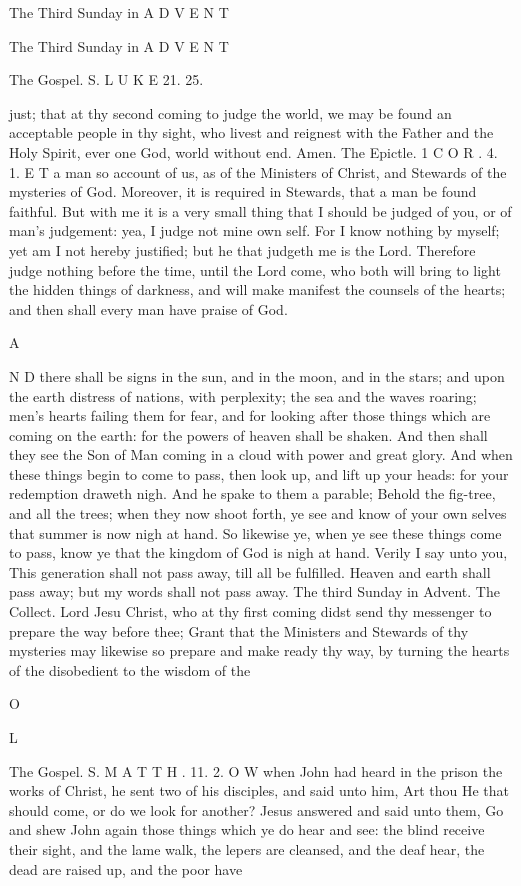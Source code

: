 The Third Sunday in A D V E N T

The Third Sunday in A D V E N T

The Gospel. S. L U K E 21. 25.

just; that at thy second coming to judge the world, we may be found an acceptable people in thy sight, who livest and reignest with the Father and the Holy Spirit, ever one God, world without end. Amen. The Epictle. 1 C O R . 4. 1. E T a man so account of us, as of the Ministers of Christ, and Stewards of the mysteries of God. Moreover, it is required in Stewards, that a man be found faithful. But with me it is a very small thing that I should be judged of you, or of man's judgement: yea, I judge not mine own self. For I know nothing by myself; yet am I not hereby justified; but he that judgeth me is the Lord. Therefore judge nothing before the time, until the Lord come, who both will bring to light the hidden things of darkness, and will make manifest the counsels of the hearts; and then shall every man have praise of God.

A

N D there shall be signs in the sun, and in the moon, and in the stars; and upon the earth distress of nations, with perplexity; the sea and the waves roaring; men's hearts failing them for fear, and for looking after those things which are coming on the earth: for the powers of heaven shall be shaken. And then shall they see the Son of Man coming in a cloud with power and great glory. And when these things begin to come to pass, then look up, and lift up your heads: for your redemption draweth nigh. And he spake to them a parable; Behold the fig-tree, and all the trees; when they now shoot forth, ye see and know of your own selves that summer is now nigh at hand. So likewise ye, when ye see these things come to pass, know ye that the kingdom of God is nigh at hand. Verily I say unto you, This generation shall not pass away, till all be fulfilled. Heaven and earth shall pass away; but my words shall not pass away. The third Sunday in Advent. The Collect. Lord Jesu Christ, who at thy first coming didst send thy messenger to prepare the way before thee; Grant that the Ministers and Stewards of thy mysteries may likewise so prepare and make ready thy way, by turning the hearts of the disobedient to the wisdom of the

O

L

The Gospel. S. M A T T H . 11. 2. O W when John had heard in the prison the works of Christ, he sent two of his disciples, and said unto him, Art thou He that should come, or do we look for another? Jesus answered and said unto them, Go and shew John again those things which ye do hear and see: the blind receive their sight, and the lame walk, the lepers are cleansed, and the deaf hear, the dead are raised up, and the poor have

